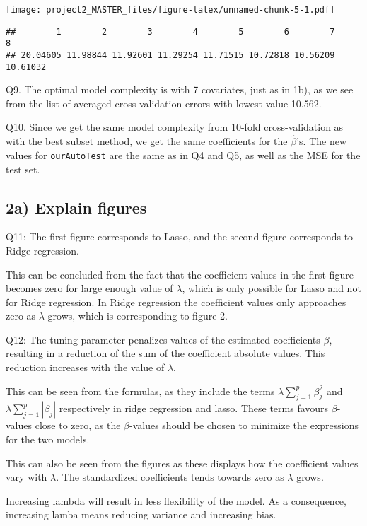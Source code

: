 \documentclass[]{article}
\begin{document}
\texttt{[image: project2\_MASTER\_files/figure-latex/unnamed-chunk-5-1.pdf]}

\begin{verbatim}
##        1        2        3        4        5        6        7        8 
## 20.04605 11.98844 11.92601 11.29254 11.71515 10.72818 10.56209 10.61032
\end{verbatim}

Q9. The optimal model complexity is with 7 covariates, just as in 1b),
as we see from the list of averaged cross-validation errors with lowest
value 10.562.

Q10. Since we get the same model complexity from 10-fold
cross-validation as with the best subset method, we get the same
coefficients for the \(\hat\beta\)'s. The new values for
\texttt{ourAutoTest} are the same as in Q4 and Q5, as well as the MSE
for the test set.

\subsection{2a) Explain figures}\label{a-explain-figures}

Q11: The first figure corresponds to Lasso, and the second figure
corresponds to Ridge regression.

This can be concluded from the fact that the coefficient values in the
first figure becomes zero for large enough value of \(\lambda\), which
is only possible for Lasso and not for Ridge regression. In Ridge
regression the coefficient values only approaches zero as \(\lambda\)
grows, which is corresponding to figure 2.

Q12: The tuning parameter penalizes values of the estimated coefficients
\(\beta\), resulting in a reduction of the sum of the coefficient
absolute values. This reduction increases with the value of \(\lambda\).

This can be seen from the formulas, as they include the terms
\(\lambda \sum_{j=1}^p \beta_j^2\) and
\(\lambda \sum_{j=1}^p |\beta_j|\) respectively in ridge regression and
lasso. These terms favours \(\beta\)-values close to zero, as the
\(\beta\)-values should be chosen to minimize the expressions for the
two models.

This can also be seen from the figures as these displays how the
coefficient values vary with \(\lambda\). The standardized coefficients
tends towards zero as \(\lambda\) grows.

Increasing lambda will result in less flexibility of the model. As a
consequence, increasing lamba means reducing variance and increasing
bias.
\end{document}
